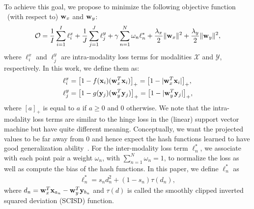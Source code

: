 To achieve this goal, we propose to minimize the following objective function \wrt~(with respect to) ${\bf w}_{x}$ and ${\bf w}_{y}$:
\begin{align}
\mathcal{O}= \frac{1}{I}\sum\limits_{i=1}^{I}\ell_{i}^{x}+\frac{1}{J}\sum\limits_{j=1}^{J}\ell_{j}^{y}+\gamma\sum_{n=1}^{N}\omega_{n}\ell_{n}^{*}+\frac{\lambda_{x}}{2}\|{\bf w}_{x}\|^{2}+\frac{\lambda_{y}}{2}\|{\bf w}_{y}\|^{2},
\label{eqn:loss}
\end{align}
where $\ell_{i}^{x}$ and $\ell_{j}^{y}$ are intra-modality loss terms for modalities $\mathcal{X}$ and $\mathcal{Y}$, respectively. In this work, we define them as:
\begin{align}
\ell_{i}^{x}&=\big[1-f({\bf x}_i)({\bf w}_{x}^{T}{\bf x}_i)\big]_{+}=\big[1-|{\bf w}_{x}^{T}{\bf x}_{i}|\big]_{+},\nonumber\\
\ell_{j}^{y}&=\big[1-g({\bf y}_j)({\bf w}_{y}^{T}{\bf y}_j)\big]_{+}=\big[1-|{\bf w}_{y}^{T}{\bf y}_{j}|\big]_{+},\nonumber
\end{align}
where $[a]_{+}$ is equal to $a$ if $a \ge 0$ and 0 otherwise.  We note that the intra-modality loss terms are similar to the hinge loss in the (linear) support vector machine but have quite different meaning. Conceptually, we want the projected values to be far away from 0 and hence expect the hash functions learned to have good generalization ability~\cite{mu2010cvpr}.
For the inter-modality loss term $\ell_{n}^{*}$, we associate with each point pair a weight $\omega_{n}$, with $\sum\nolimits_{n=1}^{N}\omega_n=1$, to normalize the loss as well as compute the bias of the hash functions. In this paper, we define $\ell_{n}^{*}$ as
\begin{align}
\ell_{n}^{*} = s_{n}d_{n}^{2}+(1-s_{n})\tau(d_{n}),\nonumber
\end{align}
where $d_{n} = {\bf w}_{x}^{T}{\bf x}_{a_n}-{\bf w}_{y}^{T}{\bf y}_{b_n}$ and $\tau(d)$ is called the smoothly clipped inverted squared deviation (\mbox{SCISD}) function. 




